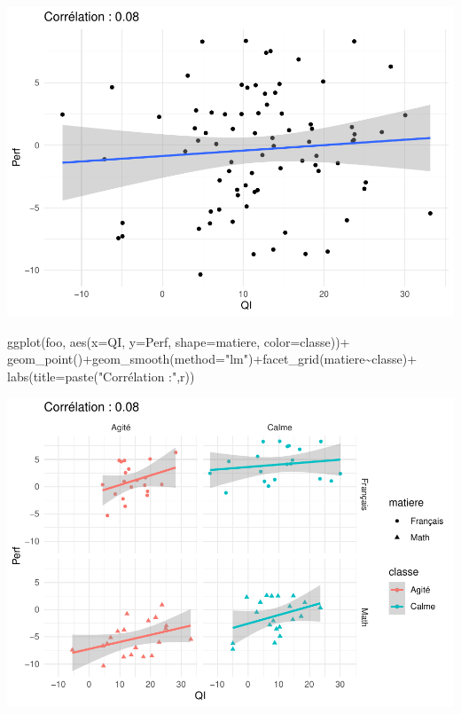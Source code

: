 \documentclass[
]{book}
\newenvironment{Shaded}{\begin{snugshade}}{\end{snugshade}}
\newcommand{\AttributeTok}[1]{\textcolor[rgb]{0.77,0.63,0.00}{#1}}
\newcommand{\FunctionTok}[1]{\textcolor[rgb]{0.00,0.00,0.00}{#1}}
\newcommand{\NormalTok}[1]{#1}
\newcommand{\SpecialCharTok}[1]{\textcolor[rgb]{0.00,0.00,0.00}{#1}}
\newcommand{\StringTok}[1]{\textcolor[rgb]{0.31,0.60,0.02}{#1}}
\begin{document}
\includegraphics{bookdown-demo_files/figure-latex/1101-1.pdf}

\begin{Shaded}
\begin{Highlighting}[]
\FunctionTok{ggplot}\NormalTok{(foo, }\FunctionTok{aes}\NormalTok{(}\AttributeTok{x=}\NormalTok{QI, }\AttributeTok{y=}\NormalTok{Perf, }\AttributeTok{shape=}\NormalTok{matiere, }\AttributeTok{color=}\NormalTok{classe))}\SpecialCharTok{+}
  \FunctionTok{geom\_point}\NormalTok{()}\SpecialCharTok{+}\FunctionTok{geom\_smooth}\NormalTok{(}\AttributeTok{method=}\StringTok{"lm"}\NormalTok{)}\SpecialCharTok{+}\FunctionTok{facet\_grid}\NormalTok{(matiere}\SpecialCharTok{\textasciitilde{}}\NormalTok{classe)}\SpecialCharTok{+}
  \FunctionTok{labs}\NormalTok{(}\AttributeTok{title=}\FunctionTok{paste}\NormalTok{(}\StringTok{"Corrélation :"}\NormalTok{,r))}
\end{Highlighting}
\end{Shaded}

\includegraphics{bookdown-demo_files/figure-latex/1101-2.pdf}
\end{document}
